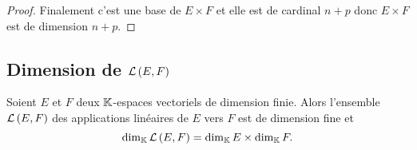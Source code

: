\begin{proof}
  Finalement c'est une base de \(E \times F\) et elle est de cardinal \(n+p\)
  donc \(E \times F\) est de dimension \(n+p\).
\end{proof}

\subsection{Dimension de \(\mathcal{L}\left(E,F\right)\)}

\begin{theo}
  Soient \(E\) et \(F\) deux \(\mathbb{K}\)-espaces vectoriels de dimension finie. Alors
  l'ensemble \(\mathcal{L}\left(E,F\right)\) des applications linéaires de \(E\) vers \(F\) est
  de dimension fine et
  \begin{equation}
    \operatorname{dim}_{\mathbb{K}} \mathcal{L}\left(E,F\right) = \operatorname{dim}_{\mathbb{K}} E \times \operatorname{dim}_{\mathbb{K}} F.
  \end{equation}
\end{theo}
